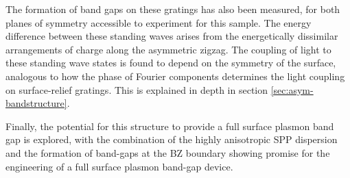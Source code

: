 The formation of band gaps on these gratings has also been measured, for both planes of symmetry accessible to experiment for this sample. The energy difference between these standing waves arises from the energetically dissimilar arrangements of charge along the asymmetric zigzag. The coupling of light to these standing wave states is found to depend on the symmetry of the surface, analogous to how the phase of Fourier components determines the light coupling on surface-relief gratings. This is explained in depth in section \ref{sec:asym-bandstructure}.

Finally, the potential for this structure to provide a full surface plasmon band gap is explored, with the combination of the highly anisotropic SPP dispersion and the formation of band-gaps at the BZ boundary showing promise for the engineering of a full surface plasmon band-gap device.